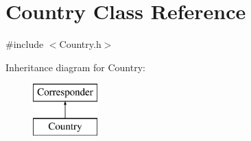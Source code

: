 \hypertarget{class_country}{}\section{Country Class Reference}
\label{class_country}


{\ttfamily \#include $<$Country.\+h$>$}

Inheritance diagram for Country\+:\begin{figure}[H]
\begin{center}
\leavevmode
\includegraphics[height=2.000000cm]{class_country}
\end{center}
\end{figure}
